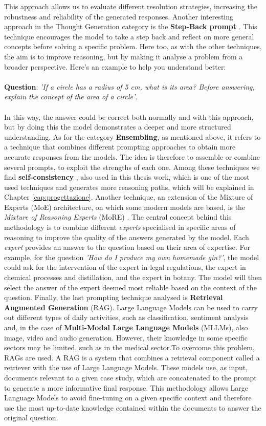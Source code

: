 This approach allows us to evaluate different resolution strategies, increasing the robustness and reliability of the generated responses. Another interesting approach in the Thought Generation category is the \textbf{Step-Back prompt} \cite{Stepback}.
This technique encourages the model to take a step back and reflect on more general concepts before solving a specific problem. Here too, as with the other techniques, the aim is to improve reasoning, but by making it analyse a problem from a broader perspective.
Here's an example to help you understand better:\\
\\
\textbf{Question}: \textit{'If a circle has a radius of 5 cm, what is its area? Before answering, explain the concept of the area of a circle'}.\\
\\
In this way, the answer could be correct both normally and with this approach, but by doing this the model demonstrates a deeper and more structured understanding.
As for the category \textbf{Ensembling}, as mentioned above, it refers to a technique that combines different prompting approaches to obtain more accurate responses from the models. 
The idea is therefore to assemble or combine several prompts, to exploit the strengths of each one. Among these techniques we find \textbf{self-consistency} \cite{SC}, also used in this thesis work, which is one of the most used techniques and generates more reasoning paths, which will be explained in Chapter \ref{cap:progettazione}.
Another technique, an extension of the Mixture of Experts (MoE) \cite{MoE} architecture, on which some modern models are based, is the \textit{Mixture of Reasoning Experts} (MoRE) \cite{MoRE}.
The central concept behind this methodology is to combine different \textit{experts} specialised in specific areas of reasoning to improve the quality of the answers generated by the model.
Each \textit{expert} provides an answer to the question based on their area of expertise.
For example, for the question \textit{'How do I produce my own homemade gin?'},  the model could ask for the intervention of the expert in legal regulations, the expert in chemical processes and distillation, and the expert in botany. The model will then select the answer of the expert deemed most reliable based on the context of the question.
Finally, the last prompting technique analysed is \textbf{Retrieval Augmented Generation }(RAG)\cite{Rag}.
Large Language Models can be used to carry out different types of daily activities, such as classification, sentiment analysis and, in the case of \textbf{Multi-Modal Large Language Models} (MLLMs)\cite{Yin_2024}, also image, video and audio generation. However, their knowledge in some specific sectors may be limited, such as in the medical sector.To overcome this problem, RAGs are used. A RAG is a system that combines a retrieval component called a retriever with the use of Large Language Models. These models use, as input, documents relevant to a given case study, which are concatenated to the prompt to generate a more informative final response. This methodology allows Large Language Models to avoid fine-tuning on a given specific context and therefore use the most up-to-date knowledge contained within the documents to answer the original question.

